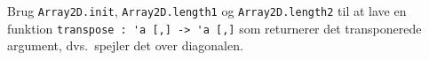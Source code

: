 Brug \lstinline{Array2D.init}, \lstinline{Array2D.length1} og \lstinline{Array2D.length2} til at lave en funktion \lstinline{transpose : 'a [,] -> 'a [,]} som returnerer det transponerede argument, dvs.\ spejler det over diagonalen.

